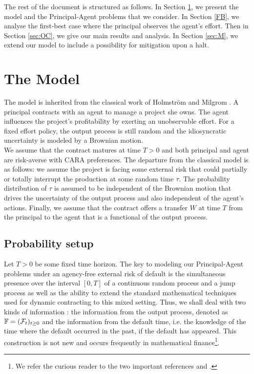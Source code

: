\documentclass[numbook, envcountsect, envcountsame, envcountreset, runningheads, smallextended]{article}
\def\Fc{{\cal F}}
\begin{document}
The rest of the document is structured as follows. In Section \ref{sec:mod}, we present the model and the Principal-Agent problems that we consider.  In Section \ref{FB}, we  analyse the first-best case where the principal observes the agent’s effort. Then in Section \ref{sec:OC}, we give our main results and analysis. In Section \ref{sec:M}, we extend our model to include a possibility for mitigation upon a halt. 

\section{The Model}\label{sec:mod}
The model is inherited from the classical work of Holmström and Milgrom \cite{HM}. A principal contracts with an agent to manage a project she owns. The agent influences the project’s profitability by exerting an unobservable effort. For a fixed effort policy, the output process is still random and the idiosyncratic uncertainty is modeled by a Brownian motion.\\
We assume that the contract matures at time $T>0$ and both principal and agent are risk-averse with CARA preferences. The departure from the classical model is as follows: we assume the project is facing some external risk that could partially or totally interrupt the production at some random time $\tau$. The probability distribution of $\tau$ is assumed to be independent of the Brownian motion that drives the uncertainty of the output process and also independent of the agent’s actions. 
Finally, we assume that the contract offers a transfer $W$ at time $T$ from the principal to the agent that is a functional of the output process.


\subsection{Probability setup}

Let $T > 0$ be some fixed time horizon. The key to modeling our Principal-Agent problems under an agency-free external risk of default is the simultaneous presence over the interval $[0,T]$ of a continuous random process and a jump process as well as the ability to extend the standard mathematical techniques used for dynamic contracting to this mixed setting. Thus, we shall deal with two kinds of information : the information from the output process, denoted as $\mathbb{F}=(\Fc_t)_{t \ge 0}$ and the information from the default time, i.e. the knowledge of the time where the default occurred in the past, if the default has appeared. This construction is not new and occurs frequently in mathematical finance\footnote{We refer the curious reader to the two important references \cite{AksamitJeanblanc} and \cite{JB}.}. \\
\end{document}
